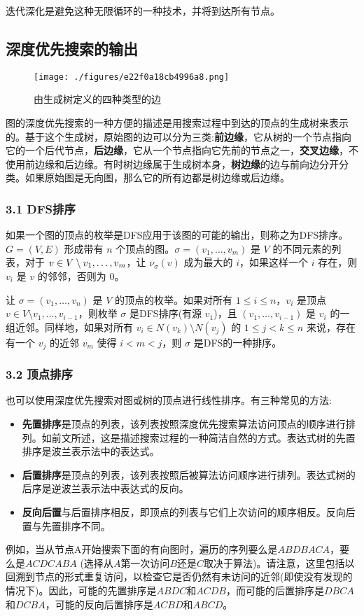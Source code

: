 迭代深化是避免这种无限循环的一种技术，并将到达所有节点。

\subsection{深度优先搜索的输出}
\begin{figure}[ht]
\centering
\texttt{[image: ./figures/e22f0a18cb4996a8.png]}
\caption{由生成树定义的四种类型的边} \label{fig_SDYXSS_2}
\end{figure}
图的深度优先搜索的一种方便的描述是用搜索过程中到达的顶点的生成树来表示的。基于这个生成树，原始图的边可以分为三类:\textbf{前边缘}，它从树的一个节点指向它的一个后代节点，\textbf{后边缘}，它从一个节点指向它先前的节点之一，\textbf{交叉边缘}，不使用前边缘和后边缘。有时树边缘属于生成树本身，\textbf{树边缘}的边与前向边分开分类。如果原始图是无向图，那么它的所有边都是树边缘或后边缘。
\subsubsection{3.1 DFS排序}
如果一个图的顶点的枚举是DFS应用于该图的可能的输出，则称之为DFS排序。$G = (V, E)$ 形成带有 $n$ 个顶点的图。$\sigma = (v_1, \ldots, v_m)$ 是 $V$ 的不同元素的列表，对于 $v \in V \setminus \\{v_1, \ldots, v_m}$，让 $\nu_\sigma(v)$ 成为最大的 $i$，如果这样一个 $i$ 存在，则 $v_i$ 是 $v$ 的邻邻，否则为 $0$。

让 $\sigma = (v_1, \ldots, v_n)$ 是 $V$ 的顶点的枚举。如果对所有 $1 \leq i \leq n$，$v_i$ 是顶点 $v \in V \setminus {v_1, \ldots, v_{i-1}}$，则枚举 $\sigma$ 是DFS排序(有源 $v_1$)，且 $(v_1, \ldots, v_{i-1})$ 是 $v_i$ 的一组近邻。同样地，如果对所有 $v_i \in N(v_k) \setminus N(v_j)$ 的 $1 \leq j < k \leq n$ 来说，存在有一个 $v_j$ 的近邻 $v_m$ 使得 $i < m < j$，则 $\sigma$ 是DFS的一种排序。
\subsubsection{3.2 顶点排序}
也可以使用深度优先搜索对图或树的顶点进行线性排序。有三种常见的方法:
\begin{itemize}
\item \textbf{先置排序}是顶点的列表，该列表按照深度优先搜索算法访问顶点的顺序进行排列。如前文所述，这是描述搜索过程的一种简洁自然的方式。表达式树的先置排序是波兰表示法中的表达式。
\item \textbf{后置排序}是顶点的列表，该列表按照后被算法访问顺序进行排列。表达式树的后序是逆波兰表示法中表达式的反向。
\item \textbf{反向后置}与后置排序相反，即顶点的列表与它们上次访问的顺序相反。反向后置与先置排序不同。
\end{itemize}
例如，当从节点A开始搜索下面的有向图时，遍历的序列要么是$A B D B A C A$，要么是$A C D C A B A$ (选择从$A$第一次访问$B$还是$C$取决于算法)。请注意，这里包括以回溯到节点的形式重复访问，以检查它是否仍然有未访问的近邻(即使没有发现的情况下)。因此，可能的先置排序是$A B D C$和$A C D B$，而可能的后置排序是$D B C A$和$D C B A$，可能的反向后置排序是$A C B D$和$A B C D$。

